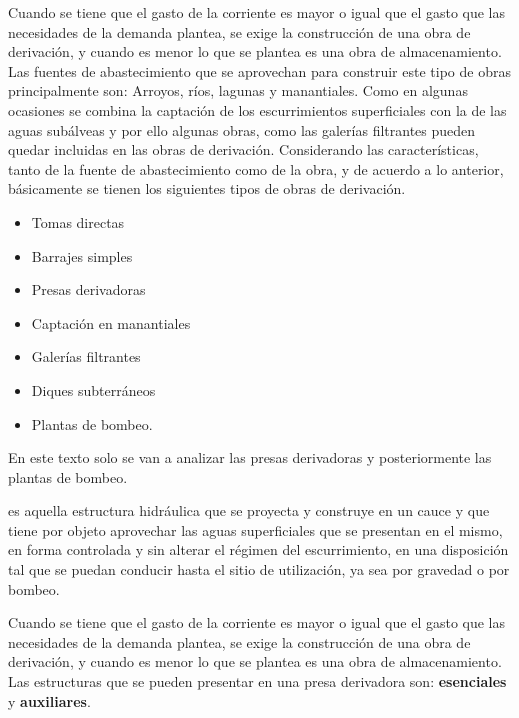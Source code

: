 Cuando se tiene que el gasto de la corriente es mayor o igual que el gasto que
las necesidades de la demanda plantea, se exige la construcción de una obra de
derivación, y cuando es menor lo que se plantea es una obra de almacenamiento.
Las fuentes de abastecimiento que se aprovechan para construir este tipo de
obras principalmente son: Arroyos, ríos, lagunas y manantiales. Como en algunas
ocasiones se combina la captación de los escurrimientos superficiales con la de las
aguas subálveas y por ello algunas obras, como las galerías filtrantes pueden quedar
incluidas en las obras de derivación.
Considerando las características, tanto de la fuente de abastecimiento como de
la obra, y de acuerdo a lo anterior, básicamente se tienen los siguientes tipos de obras
de derivación.

\begin{itemize}
	\item Tomas directas
	\item Barrajes simples
	\item Presas derivadoras
	\item Captación en manantiales
	\item Galerías filtrantes
	\item Diques subterráneos
	\item Plantas de bombeo.
\end{itemize}

En este texto solo se van a analizar las presas derivadoras y posteriormente las plantas
de bombeo.

\begin{definition}
	es aquella estructura hidráulica que se proyecta y
	construye en un cauce y que tiene por objeto aprovechar las aguas superficiales que se
	presentan en el mismo, en forma controlada y sin alterar el régimen del escurrimiento,
	en una disposición tal que se puedan conducir hasta el sitio de utilización, ya sea por
	gravedad o por bombeo.
\end{definition}

Cuando se tiene que el gasto de la corriente es mayor o igual que el gasto que
las necesidades de la demanda plantea, se exige la construcción de una obra de
derivación, y cuando es menor lo que se plantea es una obra de almacenamiento.
Las estructuras que se pueden presentar en una presa derivadora son:
\textbf{esenciales} y \textbf{auxiliares}.

